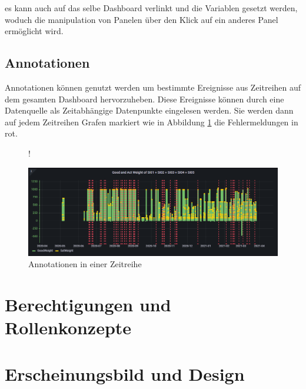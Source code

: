 \documentclass[a4paper, 12pt, oneside]{scrbook}
\begin{document}
		 	\noindent es kann auch auf das selbe Dashboard verlinkt und die Variablen gesetzt werden, woduch die manipulation von Panelen über den Klick auf ein anderes Panel ermöglicht wird.
			 
			 
		\subsection{Annotationen}
			 
			\noindent Annotationen können genutzt werden um bestimmte Ereignisse aus Zeitreihen auf dem gesamten Dashboard hervorzuheben. Diese Ereignisse können durch eine Datenquelle als Zeitabhängige Datenpunkte eingelesen werden. Sie werden dann auf jedem Zeitreihen Grafen markiert wie in Abbildung \ref{fig:annotations} die Fehlermeldungen in rot.
			 
			 \begin{figure} [H]
			 	\centering
			 	\resizebox{\linewidth} {!} {
			 		\includegraphics{res/annotaitons.png}
			 		
			 	}
			 	\caption{Annotationen in einer Zeitreihe}
			 	\label{fig:annotations}
			 \end{figure}
	 
	 \section{Berechtigungen und Rollenkonzepte}
	 \section{Erscheinungsbild und Design}
	
	\frontmatter
	\printbibliography
\end{document}
